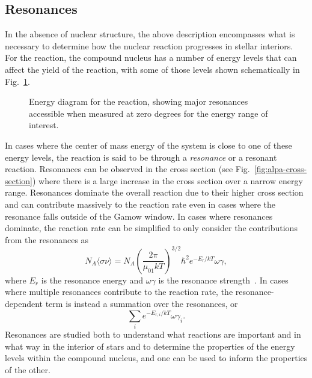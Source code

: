 \subsection{Resonances}

In the absence of nuclear structure, the above description encompasses
what is necessary to determine how the nuclear reaction progresses in
stellar interiors. For the \alpa{} reaction, the compound nucleus
 has a number of energy levels that can affect the yield
of the reaction, with some of those levels shown schematically in
Fig.~\ref{fig:alpa}.

\begin{figure}[t]
    \begin{center}
        \caption[Energy diagram for the \alpa{} reaction]{Energy diagram
            for the \alpa{} reaction, showing major resonances
            accessible when measured at zero degrees for the energy
            range of interest.}
        \label{fig:alpa}
    \end{center}
\end{figure}

In cases where the center of mass energy of the system is close to one
of these energy levels, the reaction is said to be through a
\emph{resonance} or a resonant reaction. Resonances can be observed in
the cross section (see Fig.~\ref{fig:alpa-cross-section}) where there is
a large increase in the cross section over a narrow energy range.
Resonances dominate the overall reaction due to their higher cross
section and can contribute massively to the reaction rate even in cases
where the resonance falls outside of the Gamow window. In cases where
resonances dominate, the reaction rate can be simplified to only
consider the contributions from the resonances as
\[
    N_A\langle\sigma\nu\rangle = N_A\left(\frac{2\pi}{\mu_{01}kT}\right)^{3/2}
        \hbar^2e^{-E_r/kT}\omega\gamma,
\]
where $E_r$ is the resonance energy and $\omega\gamma$ is the resonance
strength~\cite{Iliadis}. In cases where multiple resonances contribute
to the reaction rate, the resonance-dependent term is instead a
summation over the resonances, or
\[
    \sum_i e^{-E_{r,i}/kT}\omega\gamma_i.
\]
Resonances are studied both to understand what reactions are important
and in what way in the interior of stars and to determine the properties
of the energy levels within the compound nucleus, and one can be used to
inform the properties of the other.

